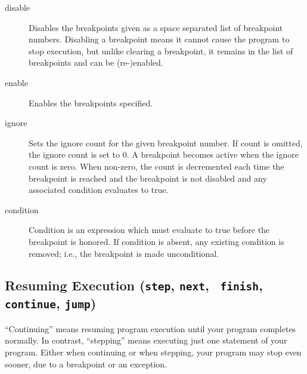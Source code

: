 \begin{description}
\item[disable ]

Disables the breakpoints given as a space separated list of
breakpoint numbers.  Disabling a breakpoint means it cannot cause
the program to stop execution, but unlike clearing a breakpoint, it
remains in the list of breakpoints and can be (re-)enabled.

\item[enable ]

Enables the breakpoints specified.

\item[ignore  ]

Sets the ignore count for the given breakpoint number.  If
count is omitted, the ignore count is set to 0.  A breakpoint
becomes active when the ignore count is zero.  When non-zero,
the count is decremented each time the breakpoint is reached
and the breakpoint is not disabled and any associated condition
evaluates to true.

\item[condition  ]

Condition is an expression which must evaluate to true before
the breakpoint is honored.  If condition is absent, any existing
condition is removed; i.e., the breakpoint is made unconditional.

\end{description}

\subsection{Resuming Execution ({\tt step}, {\tt next}, {\tt
    finish}, {\tt continue}, {\tt jump})\label{subsubsection:resume}}

``Continuing'' means resuming program execution until your program
completes normally.  In contrast, ``stepping'' means executing just
one statement of your program. Either when continuing or when
stepping, your program may stop even sooner, due to a breakpoint or an
exception.

